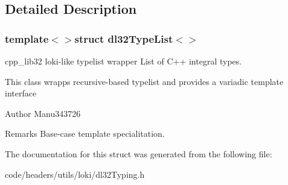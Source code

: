 \subsection{Detailed Description}
\subsubsection*{template$<$$>$struct dl32\-Type\-List$<$$>$}

cpp\-\_\-lib32 loki-\/like typelist wrapper List of C++ integral types. 

This class wrapps recursive-\/based typelist and provides a variadic template interface

\begin{DoxyAuthor}{Author}
Manu343726
\end{DoxyAuthor}
\begin{DoxyRemark}{Remarks}
Base-\/case template specialitation. 
\end{DoxyRemark}


The documentation for this struct was generated from the following file\-:\begin{DoxyCompactItemize}
\item 
code/headers/utils/loki/dl32\-Typing.\-h\end{DoxyCompactItemize}
